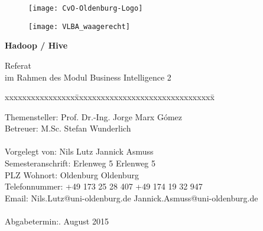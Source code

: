 
\begin{titlepage}
  \begin{centering}
  \begin{figure}[h!]
    \centering
    \texttt{[image: CvO-Oldenburg-Logo]}    %
  \end{figure}

  \vspace*{-0.8cm}

  \begin{figure}[h!]
    \centering
    \texttt{[image: VLBA\_waagerecht]}    %
  \end{figure}

  \vspace*{0.4cm}
  
  \textsf{\Huge \textbf{Hadoop / Hive\\}}

  \vspace*{0.5cm}
  \noindent Referat\\
  im Rahmen des Modul Business Intelligence 2     %

  \end{centering}
  \vspace*{1.5cm}
  \begin{tabbing}
  xxxxxxxxxxxxxxxx\= xxxxxxxxxxxxxxxxxxxxxxxxxxxxxxxx\= \kill
  
  \small Themensteller:\> Prof. Dr.-Ing. Jorge Marx Gómez\\
  \small Betreuer:\> M.Sc. Stefan Wunderlich\\\\

  \small Vorgelegt von: \>Nils Lutz \>Jannick Asmuss\\
  \small Semesteranschrift: \>Erlenweg 5 \>Erlenweg 5\\
  \small PLZ Wohnort:  Oldenburg  Oldenburg\\
  \small Telefonnummer: \>+49 173 25 28 407 \>+49 174 19 32 947\\
  \small Email: \>Nils.Lutz@uni-oldenburg.de \>Jannick.Asmuss@uni-oldenburg.de\\\\

  \small Abgabetermin:. August 2015
  \end{tabbing}
\end{titlepage}